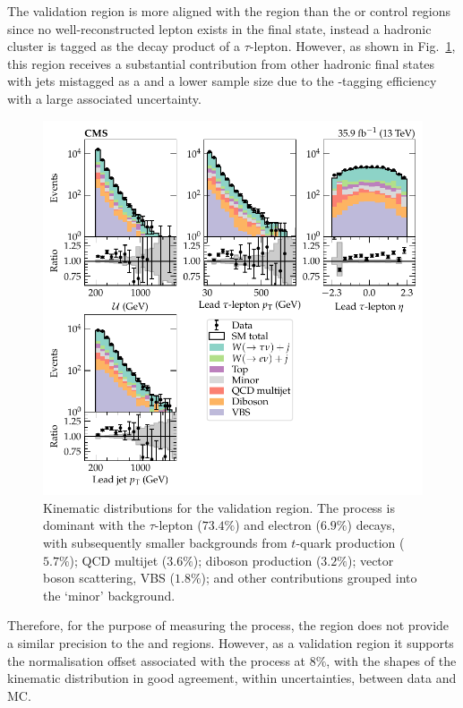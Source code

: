 The \tauplusjets validation region is more aligned with the \metplusjets region than the \muplusjets or \eleplusjets control regions since no well-reconstructed lepton exists in the final state, instead a hadronic cluster is tagged as the decay product of a $\tau$-lepton. However, as shown in Fig.~\ref{fig:tauplusjets}, this region receives a substantial contribution from other hadronic final states with jets mistagged as a \Ptauh and a lower sample size due to the \Ptauh-tagging efficiency with a large associated uncertainty.
%
\begin{figure}[htb]
    \centering
    \includegraphics{chapters/042_backgrounds/images/singletau_dists.pdf}
    \caption[Single hadronic $\tau$-lepton final state kinematics.]{
        Kinematic distributions for the \tauplusjets validation region. The \IWj process is dominant with the $\tau$-lepton ($73.4\%$) and electron ($6.9\%$) decays, with subsequently smaller backgrounds from $t$-quark production ($5.7\%$); QCD multijet ($3.6\%$); diboson production ($3.2\%$); vector boson scattering, VBS ($1.8\%$); and other contributions grouped into the `minor' background.
    }
    \label{fig:tauplusjets}
\end{figure}
%
Therefore, for the purpose of measuring the \IWj process, the \tauplusjets region does not provide a similar precision to the \muplusjets and \eleplusjets regions. However, as a validation region it supports the normalisation offset associated with the \IWj process at $8\%$, with the shapes of the kinematic distribution in good agreement, within uncertainties, between data and MC.


